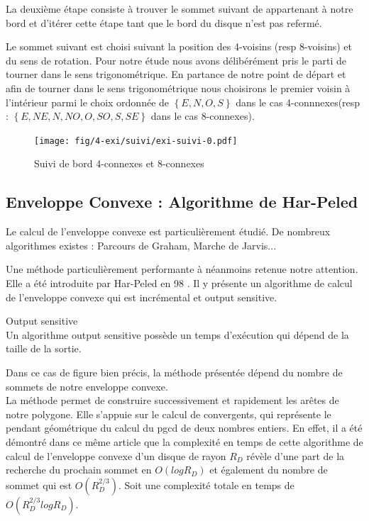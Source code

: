 La deuxième étape consiste à trouver le sommet suivant de appartenant à notre bord et d'itérer cette étape tant que le bord du disque n'est pas refermé.

Le sommet suivant est choisi suivant la position des 4-voisins (resp 8-voisins) et du sens de rotation. Pour notre étude nous avons délibérément pris le parti de tourner dans le sens trigonométrique. En partance de notre point de départ et afin de tourner dans le sens trigonométrique nous choisirons le premier voisin à l'intérieur parmi le choix ordonnée de $\left\{E, N, O, S\right\}$ dans le cas 4-connnexes(resp :  $\left\{E, NE, N, NO, O, SO, S, SE \right\}$ dans le cas 8-connexes).

\begin{figure}[h!]
  \centering
  \texttt{[image: fig/4-exi/suivi/exi-suivi-0.pdf]}
  \caption{Suivi de bord 4-connexes et 8-connexes}
\end{figure}
  

\subsection{Enveloppe Convexe : Algorithme de Har-Peled}

Le calcul de l'enveloppe convexe est particulièrement étudié. De nombreux algorithmes existes : Parcours de Graham, Marche de Jarvis... 

Une méthode particulièrement performante à néanmoins retenue notre attention. Elle a été introduite par Har-Peled en 98 \cite{HarPeled98}. Il y présente un algorithme de calcul de l'enveloppe convexe qui est incrémental et output sensitive.


\begin{Definition}{Output sensitive}\\
\label{def:os}
      Un algorithme output sensitive possède un temps d’exécution qui dépend de la taille de la sortie.
\end{Definition}

Dans ce cas de figure bien précis, la méthode présentée dépend du nombre de sommets de notre enveloppe convexe. \\

La méthode permet de construire successivement et rapidement les arêtes de notre polygone. Elle s'appuie sur le calcul de convergents, qui représente le pendant géométrique du calcul du pgcd de deux nombres entiers. 
En effet, il a été démontré dans ce même article que la complexité en temps de cette algorithme de calcul de l'enveloppe convexe d'un disque de rayon $R_D$ révèle d'une part de la recherche du prochain sommet en $O(log R_D)$ et également du nombre de sommet qui est $O( R_{D}^{2/3})$. Soit une complexité totale en temps de  $O( R_{D}^{2/3} log R_D)$.


